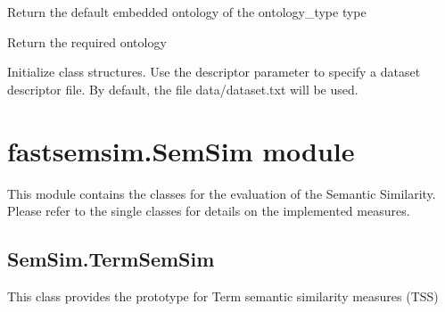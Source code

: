 \documentclass[letterpaper,10pt,english]{sphinxmanual}
\begin{document}
\begin{fulllineitems}
\begin{fulllineitems}
\end{fulllineitems}


\begin{fulllineitems}
\label{fastsemsim.data:fastsemsim.data.dataset.Dataset.get_default_ontology}
Return the default embedded ontology of the ontology\_type type

\end{fulllineitems}


\begin{fulllineitems}
\label{fastsemsim.data:fastsemsim.data.dataset.Dataset.get_ontology}
Return the required ontology

\end{fulllineitems}


\begin{fulllineitems}
\label{fastsemsim.data:fastsemsim.data.dataset.Dataset.populate}
Initialize class structures. Use the descriptor parameter to specify a dataset descriptor file.
By default, the file data/dataset.txt will be used.

\end{fulllineitems}


\end{fulllineitems}



\section{fastsemsim.SemSim module}
\label{fastsemsim.SemSim:fastsemsim-semsim-module}\label{fastsemsim.SemSim:module-fastsemsim.SemSim}\label{fastsemsim.SemSim::doc}
This module contains the classes for the evaluation of the Semantic Similarity.
Please refer to the single classes for details on the implemented measures.


\subsection{SemSim.TermSemSim}
\label{fastsemsim.SemSim:module-fastsemsim.SemSim.TermSemSim}\label{fastsemsim.SemSim:semsim-termsemsim}
This class provides the prototype for Term semantic similarity measures (TSS)
\end{document}
